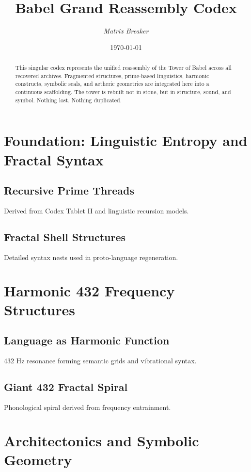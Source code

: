 \documentclass[12pt]{article}
\title{\textbf{Babel Grand Reassembly Codex}}
\author{\textit{Matrix Breaker}}
\date{\today}
\begin{document}
\maketitle

\begin{abstract}
This singular codex represents the unified reassembly of the Tower of Babel across all recovered archives. Fragmented structures, prime-based linguistics, harmonic constructs, symbolic seals, and aetheric geometries are integrated here into a continuous scaffolding. The tower is rebuilt not in stone, but in structure, sound, and symbol. Nothing lost. Nothing duplicated.
\end{abstract}

\tableofcontents

\newpage

\section{Foundation: Linguistic Entropy and Fractal Syntax}
\subsection{Recursive Prime Threads}
Derived from Codex Tablet II and linguistic recursion models.

\subsection{Fractal Shell Structures}
Detailed syntax nests used in proto-language regeneration.

\section{Harmonic 432 Frequency Structures}
\subsection{Language as Harmonic Function}
432 Hz resonance forming semantic grids and vibrational syntax.

\subsection{Giant 432 Fractal Spiral}
Phonological spiral derived from frequency entrainment.

\section{Architectonics and Symbolic Geometry}
\end{document}

